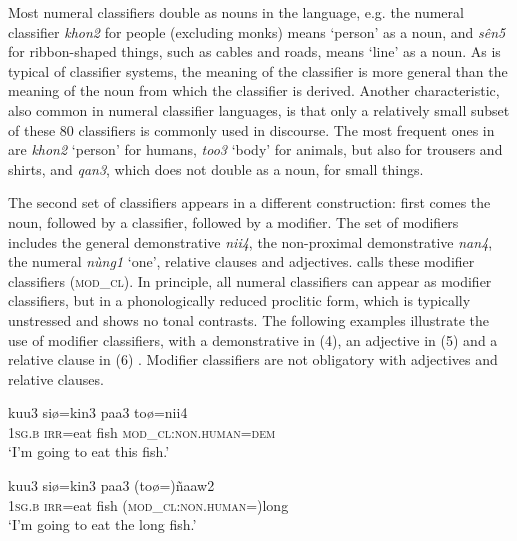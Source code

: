 \documentclass[output=paper]{langsci/langscibook}
\begin{document}
Most numeral classifiers double as nouns in the language, e.g. the numeral classifier \textit{khon2} for people (excluding monks) means ‘person’ as a noun, and \textit{sên5} for ribbon-shaped things, such as cables and roads, means ‘line’ as a noun. As is typical of classifier systems,  the meaning of the classifier is more general than the meaning of the noun from which the classifier is derived. Another characteristic, also common in numeral classifier languages, is that only a relatively small subset of these 80 classifiers is commonly used in discourse. The most frequent ones in  are \textit{khon2} ‘person’ for humans, \textit{too3} ‘body’ for animals, but also for trousers and shirts, and \textit{qan3}, which does not double as a noun, for small things.

The second set of classifiers appears in a different construction: first comes the noun, followed by a classifier, followed by a modifier. The set of modifiers includes the general demonstrative \textit{nii4}, the non-proximal demonstrative \textit{nan4}, the numeral \textit{nùng1} ‘one’, relative clauses and adjectives. \citet[137]{Enfield2007} calls these modifier classifiers  (\textsc{mod\_cl}). In principle, all numeral classifiers can appear as modifier classifiers, but in a phonologically reduced proclitic form, which is typically unstressed and shows no tonal contrasts. The following examples illustrate the use of modifier classifiers, with a demonstrative in (4), an adjective in (5) and a relative clause in (6) \citep[139,143]{Enfield2007}. Modifier classifiers are not obligatory with adjectives and relative clauses. 

\ea%
    \label{ex:fc:4}
    \gll   kuu3    siø=kin3    paa3  toø=nii4\\
	   1\textsc{sg.b}    \textsc{irr=}eat    fish  \textsc{mod\_cl}:\textsc{non.human}=\textsc{dem}\\
    \glt    ‘I’m going to eat this fish.’

    \z

	 

\ea%
    \label{ex:fc:5}

    \gll   kuu3    siø=kin3    paa3  (toø=)ñaaw2\\
	    1\textsc{sg.b}    \textsc{irr=}eat    fish  (\textsc{mod\_cl}:\textsc{non.human}=)long\\
    \glt ‘I’m going to eat the long fish.’
    \z


\ea%
    \label{ex:fc:6}
\end{document}
